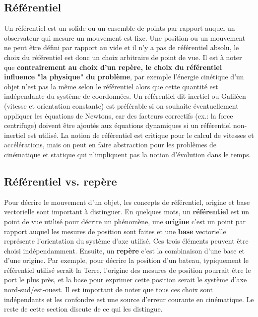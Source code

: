 \subsection{Référentiel} 
Un référentiel est un solide ou un ensemble de points par rapport auquel un observateur qui mesure un mouvement est fixe. Une position ou un mouvement ne peut être défini par rapport au vide et il n'y a pas de référentiel absolu, le choix du référentiel est donc un choix arbitraire de point de vue. Il est à noter que \textbf{contrairement au choix d'un repère, le choix du référentiel influence "la physique" du problème}, par exemple l'énergie cinétique d'un objet n'est pas la même selon le référentiel alors que cette quantité est indépendante du système de coordonnées. Un référentiel dit inertiel ou Galiléen (vitesse et orientation constante) est préférable si on souhaite éventuellement appliquer les équations de Newtons, car des facteurs correctifs (ex.: la force centrifuge) doivent être ajoutés aux équations dynamiques si un référentiel non-inertiel est utilisé. La notion de référentiel est critique pour le calcul de vitesses et accélérations, mais on peut en faire abstraction pour les problèmes de cinématique et statique qui n'impliquent pas la notion d'évolution dans le temps. 


\subsection{Référentiel vs. repère}
Pour décrire le mouvement d'un objet, les concepts de référentiel, origine et base vectorielle sont important à distinguer. En quelques mots, un \textbf{référentiel} est un point de vue utilisé pour décrire un phénomène, une \textbf{origine} c'est un point par rapport auquel les mesures de position sont faites et une \textbf{base} vectorielle représente l'orientation du système d'axe utilisé. Ces trois éléments peuvent être choisi indépendamment.  Ensuite, un \textbf{repère} c'est la combinaison d'une base et d'une origine. Par exemple, pour décrire la position d'un bateau, typiquement le référentiel utilisé serait la Terre, l'origine des mesures de position pourrait être le port le plus près, et la base pour exprimer cette position serait le système d'axe nord-sud/est-ouest. Il est important de noter que tous ces choix sont indépendants et les confondre est une source d'erreur courante en cinématique. Le reste de cette section discute de ce qui les distingue.

